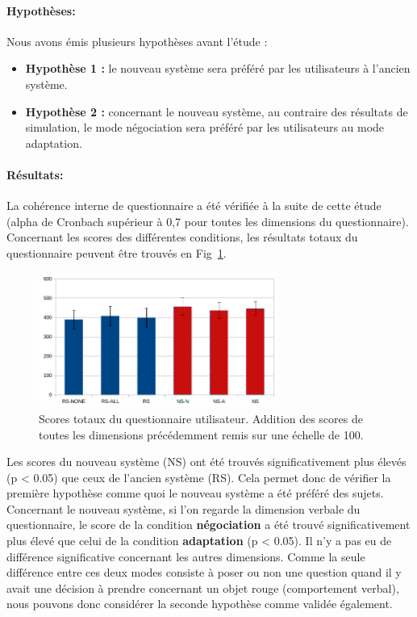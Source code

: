 \documentclass[english,a4paper,11pt,twoside]{StyleThese}
\begin{document}
\paragraph{Hypothèses:} 
Nous avons émis plusieurs hypothèses avant l'étude :
\begin{itemize}
\item \textbf{Hypothèse 1 :} le nouveau système sera préféré par les utilisateurs à l'ancien système.
\item \textbf{Hypothèse 2 :} concernant le nouveau système, au contraire des résultats de simulation, le mode négociation sera préféré par les utilisateurs au mode adaptation.
\end{itemize}

\paragraph{Résultats:}

La cohérence interne de questionnaire a été vérifiée à la suite de cette étude (alpha de Cronbach supérieur à 0,7 pour toutes les dimensions du questionnaire). Concernant les scores des différentes conditions, les résultats totaux du questionnaire peuvent être trouvés en Fig~\ref{fig:resUSTotal}.

\begin{figure}[!h]
	\centering
    \includegraphics[width=0.7\textwidth]{figs/Chapter5/Total.png}
    \caption{Scores totaux du questionnaire utilisateur. Addition des scores de toutes les dimensions précédemment remis sur une échelle de 100.}
    \label{fig:resUSTotal}
\end{figure}

Les scores du nouveau système (NS) ont été trouvés significativement plus élevés (p < 0.05) que ceux de l'ancien système (RS). Cela permet donc de vérifier la première hypothèse comme quoi le nouveau système a été préféré des sujets. Concernant le nouveau système, si l'on regarde la dimension verbale du questionnaire, le score de la condition \textbf{négociation} a été trouvé significativement plus élevé que celui de la condition \textbf{adaptation} (p < 0.05). Il n'y a pas eu de différence significative concernant les autres dimensions. Comme la seule différence entre ces deux modes consiste à poser ou non une question quand il y avait une décision à prendre concernant un objet rouge (comportement verbal), nous pouvons donc considérer la seconde hypothèse comme validée également.
\end{document}
